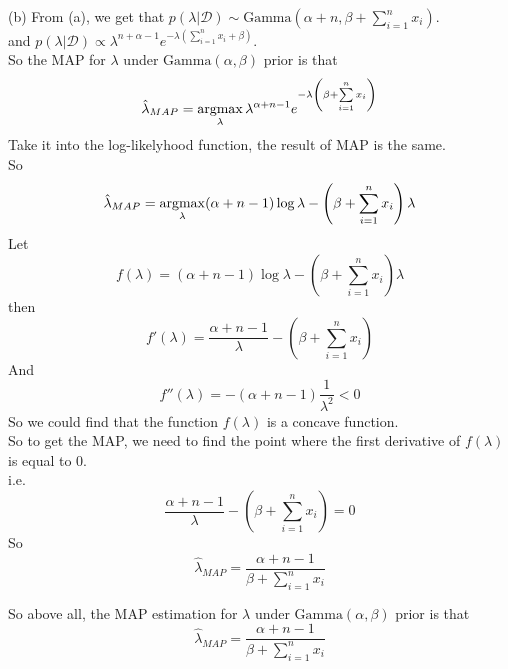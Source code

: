 (b) From (a), we get that $p(\lambda|\mathcal{D})\sim \text{Gamma}\left(\alpha+n,\beta+\sum\limits_{i=1}^nx_i\right)$.\\
and $p(\lambda|\mathcal{D})\propto\lambda^{n+\alpha-1}e^{-\lambda\left(\sum\limits_{i=1}^nx_i+\beta\right)}$.\\
So the MAP for $\lambda$ under $\text{Gamma}(\alpha,\beta)$ prior is that
$$\hat{\lambda}_{MAP}=\mathop{\rm argmax}\limits_{\lambda}\lambda^{\alpha+n-1}e^{-\lambda\left(\beta+\sum\limits_{i=1}^nx_i\right)}$$
Take it into the log-likelyhood function, the result of MAP is the same.\\
So
$$\hat{\lambda}_{MAP}=\mathop{\rm argmax}\limits_{\lambda}(\alpha+n-1)\log\lambda-\left(\beta+\sum\limits_{i=1}^nx_i\right)\lambda$$
Let $$f(\lambda)=(\alpha+n-1)\log\lambda-\left(\beta+\sum\limits_{i=1}^nx_i\right)\lambda$$
then $$f'(\lambda)=\dfrac{\alpha+n-1}{\lambda}-\left(\beta+\sum\limits_{i=1}^nx_i\right)$$
And $$f''(\lambda)=-(\alpha+n-1)\dfrac{1}{\lambda^2}<0$$
So we could find that the function $f(\lambda)$ is a concave function.\\
So to get the MAP, we need to find the point where the first derivative of $f(\lambda)$ is equal to 0.\\
i.e. $$\dfrac{\alpha+n-1}{\lambda}-\left(\beta+\sum\limits_{i=1}^nx_i\right)=0$$
So $$\hat{\lambda}_{MAP}=\dfrac{\alpha+n-1}{\beta+\sum\limits_{i=1}^nx_i}$$

So above all, the MAP estimation for $\lambda$ under $\text{Gamma}(\alpha,\beta)$ prior is that
$$\hat{\lambda}_{MAP}=\dfrac{\alpha+n-1}{\beta+\sum\limits_{i=1}^nx_i}$$

\newpage